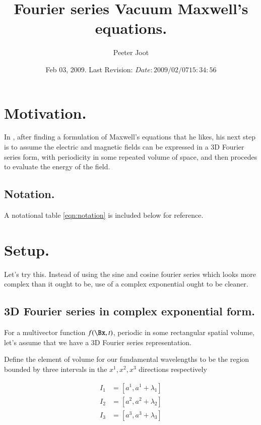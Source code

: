 \documentclass{article}
\title{ Fourier series Vacuum Maxwell's equations. }
\author{Peeter Joot}
\date{ Feb 03, 2009.  Last Revision: $Date: 2009/02/07 15:34:56 $ }
\begin{document}
\maketitle{}

\tableofcontents

\section{ Motivation. }

In \cite{bohm1989qt}, 
after finding a formulation of Maxwell's equations that he likes, his next
step is to assume the electric and magnetic fields can be expressed in 
a 3D Fourier series form, with periodicity in some repeated volume 
of space, and then procedes to evaluate the energy of the 
field.

\subsection{ Notation. }

A notational table 
\ref{eqn:notation}
is included below for reference.

\section{ Setup. }

Let's try this.  Instead of using the sine and cosine fourier series
which looks more complex than it ought to be, use of a complex exponential
ought to be cleaner.

\subsection{ 3D Fourier series in complex exponential form. }

For a multivector function $f(\Bx, t)$, periodic in some rectangular spatial volume, let's assume that we have a
3D Fourier series representation.

Define the element of volume for our fundamental wavelengths to be the region bounded by three intervals in the $x^1, x^2, x^3$ directions respectively

\begin{align*}
I_1 &= [ a^1, a^1 + \lambda_1 ] \\
I_2 &= [ a^2, a^2 + \lambda_2 ] \\
I_3 &= [ a^3, a^3 + \lambda_3 ] \\
\end{align*}
\end{document}
